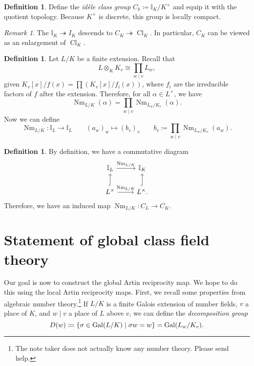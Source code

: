 \documentclass[leqno, openany]{memoir}
\theoremstyle{definition}
\newtheorem{defn}[thm]{Definition}
\theoremstyle{remark}
\newtheorem{rmk}[thm]{Remark}
\theoremstyle{plain}
\theoremstyle{definition}
\theoremstyle{remark}
\newcommand{\I}{\mathbb{I}}
\DeclareMathOperator{\Gal}{Gal}
\DeclareMathOperator{\Cl}{Cl}
\DeclareMathOperator{\Nm}{Nm}
\begin{document}
\begin{defn}
    Define the \textit{id\`ele class group} $C_k \coloneqq \I_K / K^{\times}$ and equip it with the quotient topology. Because $K^{\times}$ is discrete, this group is locally compact. 
\end{defn}

\begin{rmk}
    The $\I_K \twoheadrightarrow I_K$ descends to $C_K \twoheadrightarrow \Cl_K$. In particular, $C_K$ can be viewed as an enlargement of $\Cl_K$.
\end{rmk}

\begin{defn}
    Let $L/K$ be a finite extension. Recall that 
    \[ L \otimes_K K_v \cong \prod_{w \mid v} L_w, \]
    given $K_v[x]/f(x) = \prod (K_v[x]/f_i(x))$, where $f_i$ are the irreducible factors of $f$ after the extension. Therefore, for all $\alpha \in L^{\times}$, we have 
    \[ \Nm_{L/K}(\alpha) = \prod_{w \mid v} \Nm_{L_w/K_v} (\alpha). \]
    Now we can define
    \[ \Nm_{L/K} \colon \I_L \to \I_L \qquad {(a_w)}_w \mapsto {(b_v)}_v \qquad b_v \coloneqq \prod_{w \mid v} \Nm_{L_w/K_v}(a_w). \]
\end{defn}

\begin{defn}
    By definition, we have a commutative diagram
    \begin{equation*}
    \begin{tikzcd}
        \I_L \ar{r}{\Nm_{L/K}} & \I_K \\
        L^{\times} \ar[hookrightarrow]{u} \ar{r}{\Nm_{L/K}} & L^{\times}. \ar[hookrightarrow]{u}
    \end{tikzcd}
    \end{equation*}
    Therefore, we have an induced map $\Nm_{L/K} \colon C_L \to C_K$.
\end{defn}

\section{Statement of global class field theory}%
\label{sec:statement_of_global_class_field_theory}

Our goal is now to construct the global Artin reciprocity map. We hope to do this using the local Artin reciprocity maps. First, we recall some properties from algebraic number theory.\footnote{The note taker does not actually know any number theory. Please send help.} If $L/K$ is a finite Galois extension of number fields, $v$ a place of $K$, and $w \mid v$ a place of $L$ above $v$, we can define the \textit{decomposition group}
\[ D(w) \coloneqq \qty{\sigma \in \Gal(L/K) \mid \sigma w = w} = \Gal(L_w/K_v). \]
\end{document}
